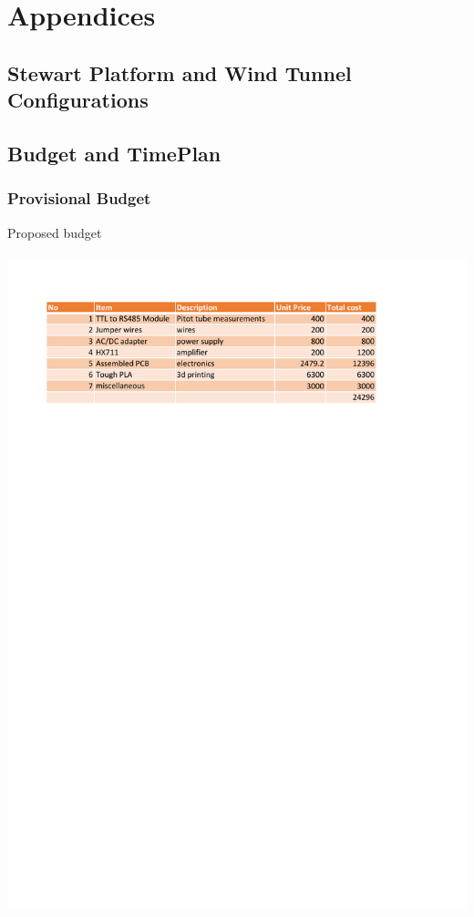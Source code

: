 \appendix
\section{Appendices}
\subsection{Stewart Platform and Wind Tunnel Configurations}


\clearpage
\subsection{Budget and TimePlan}
\subsubsection{Provisional Budget}
\begin{center}
	\begin{table}[H]
		\centering
		\caption{Proposed budget}
		\paragraph{ }
		\includegraphics{Figures/budget}
	\end{table}
\end{center}

